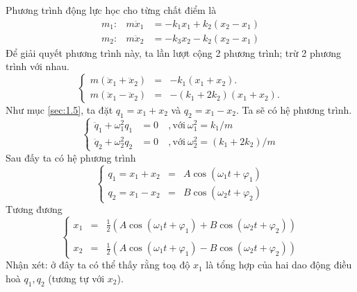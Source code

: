 Phương trình động lực học cho từng chất điểm là
\begin{equation*}
    \begin{array}{ccc}
        m_1: & m \ddot{x}_1 &= - k_1 x_1 + k_2 (x_2 - x_1) \\
        m_2: & m \ddot{x}_2 &= - k_3 x_2 - k_2 (x_2 - x_1)
    \end{array}
\end{equation*}
Để giải quyết phương trình này, ta lần lượt cộng 2 phương trình; trừ 2 phương trình với nhau.
\begin{equation}
    \left\{
    \begin{array}{ccc}
    m ( \ddot{x}_1 + \ddot{x}_2) &=& - k_1 (x_1 + x_2).   \\
    m ( \ddot{x}_1 - \ddot{x}_2) &=& - (k_1 +2 k_2) (x_1 +x_2).
    \end{array}
    \right.
    \label{eq:2.1}
\end{equation}
Như mục \ref{sec:1.5}, ta đặt \(q_1 = x_1 + x_2\) và \(q_2 = x_1 - x_2\). Ta sẽ có hệ phương trình.
\begin{equation}
    \left\{
    \begin{array}{ccl}
    \ddot{q}_1 + \omega_1^2 q_1 &= 0 & \ , \text{với} \ \omega_1^2 = k_1/m \\
    \ddot{q}_2 + \omega_2^2 q_2 &= 0 & \ , \text{với} \ \omega_2^2 = (k_1+2k_2)/m
    \end{array}
    \right.
    \label{eq:2.2}
\end{equation}
Sau đấy ta có hệ phương trình
\begin{equation}
    \left\{ 
    \begin{array}{ccc}
    q_1 = x_1 + x_2 &=& A \cos{\left( \omega_1 t + \varphi_1\right)} \\
    q_2 = x_1 - x_2 &=& B \cos{\left( \omega_2 t + \varphi_2 \right)}
    \end{array}
    \right.
    \label{eq:2.3}
\end{equation}
Tương đương
\begin{equation}
    \left\{ 
    \begin{array}{ccc}
    x_1 &=& \frac12 \left(A \cos{\left( \omega_1 t + \varphi_1\right)} + B \cos{\left( \omega_2 t + \varphi_2 \right)} \right) \\
    \\
    x_2 &=& \frac12 \left(A \cos{\left( \omega_1 t + \varphi_1\right)} - B \cos{\left( \omega_2 t + \varphi_2 \right)} \right)
    \end{array}
    \right.
\end{equation}
Nhận xét: ở đây ta có thể thấy rằng toạ độ \(x_1\) là tổng hợp của hai dao động điều hoà \(q_1, q_2\) (tương tự với \(x_2\)). 

